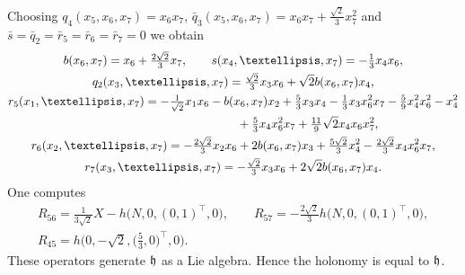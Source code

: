 \documentclass[11pt]{article}
\numberwithin{equation}{section}
\newcommand\fh{{\frak h}}
\begin{document}
\begin{Example} Choosing $q_4(x_5,x_6,x_7)=x_6 x_7$, $\bar q_3(x_5,x_6,x_7)=x_6 x_7+\frac {\sqrt2}3 x_7^2$ and $\bar s=\bar q_2=\bar r_5 =\bar r_6 =\bar r_7=0$ we obtain
\begin{gather*}
b(x_6,x_7) = x_6+\tfrac{2\sqrt2}3 x_7,\qquad
s(x_4,\dots,x_7)= -\tfrac13 x_4x_6,\\
q_2(x_3,\dots,x_7)= \tfrac{ \sqrt2}3 x_3 x_6 +\sqrt2 b(x_6,x_7)x_4 ,\\
r_5(x_1,\dots,x_7)= -\tfrac1{\sqrt2} x_1 x_6-b(x_6 ,x_7)x_2 +\tfrac 53 x_3 x_4 -\tfrac 13 x_3 x_6^2 x_7-\tfrac59 x_4^2 x_6^2 -x_4^2 \\
\hphantom{r_5(x_1,\dots,x_7)=}{} +\tfrac 53 x_4 x_6^2 x_7 +\tfrac {11}9 \sqrt2 x_4 x_6 x_7^2,\\
r_6(x_2,\dots,x_7)= -\tfrac{2\sqrt2}3x_2 x_6 +2b(x_6, x_7)x_3 +\tfrac {5\sqrt2}3 x_4^2 -\tfrac{2\sqrt2}3x_4 x_6^2 x_7, \\
r_7(x_3,\dots,x_7)= -\tfrac{\sqrt2}3 x_3 x_6 +2\sqrt2 b(x_6, x_7) x_4.
\end{gather*}
One computes
\begin{gather*} R_{56}=\tfrac 1{3\sqrt2} X-h\big(N,0,(0,1)^\top,0\big),\qquad R_{57}=-\tfrac{2\sqrt2}3 h\big(N,0,(0,1)^\top,0\big),\\ R_{45}=h\big(0,-\sqrt2,\big(\tfrac53,0\big)^\top,0\big). \end{gather*}
These operators generate $\fh$ as a Lie algebra. Hence the holonomy is equal to $\fh$.
\end{Example}
\end{document}
